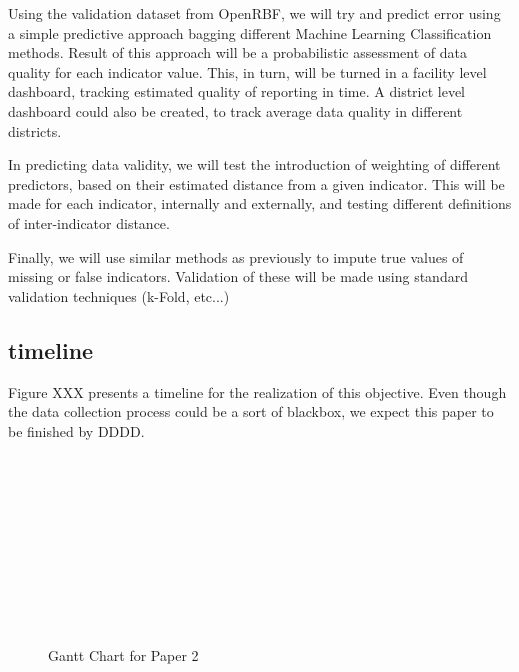 \documentclass[a4paper,11pt,final,twoside]{article}
\begin{document}
Using the validation dataset from OpenRBF, we will try and predict error using a simple predictive approach bagging different Machine Learning Classification methods. Result of this approach will be a probabilistic assessment of data quality for each indicator value. This, in turn, will be turned in a facility level dashboard, tracking estimated quality of reporting in time. A district level dashboard could also be created, to track average data quality in different districts.

In predicting data validity, we will test the introduction of weighting of different predictors, based on their estimated distance from a given indicator. This will be made for each indicator, internally and externally, and testing different definitions of inter-indicator distance.

Finally, we will use similar methods as previously to impute true values of missing or false indicators. Validation of these will be made using standard validation techniques (k-Fold, etc...)

\subsection{timeline}

Figure XXX presents a timeline for the realization of this objective. Even though the data collection process could be a sort of blackbox, we expect this paper to be finished by DDDD.

\begin{figure}[h]
\begin{ganttchart}{1}{24}
 \\
 \\
 \\
 \\
 \\
 \\
 \\
 \\
 \\
\end{ganttchart}
\caption{Gantt Chart for Paper 2}
\end{figure}
\end{document}
